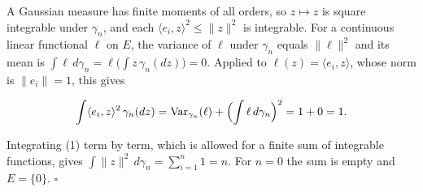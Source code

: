 \documentclass[11pt,a4paper]{article}
\begin{document}
A Gaussian measure has finite moments of all orders, so \(z\mapsto z\) is square integrable under \(\gamma_n\), and each \(\langle e_i,z\rangle^2\le\|z\|^2\) is integrable. For a continuous linear functional \(\ell\) on \(E\), the variance of \(\ell\) under \(\gamma_n\) equals \(\|\ell\|^2\) and its mean is \(\int\ell\,d\gamma_n=\ell\bigl(\int z\,\gamma_n(dz)\bigr)=0\). Applied to \(\ell(z)=\langle e_i,z\rangle\), whose norm is \(\|e_i\|=1\), this gives


\[\int\langle e_i,z\rangle^2\,\gamma_n(dz)=\operatorname{Var}_{\gamma_n}(\ell)+\Bigl(\int\ell\,d\gamma_n\Bigr)^2=1+0=1.\]


Integrating (1) term by term, which is allowed for a finite sum of integrable functions, gives \(\int\|z\|^2\,d\gamma_n=\sum_{i=1}^n1=n\). For \(n=0\) the sum is empty and \(E=\{0\}\). \(\square\)
\end{document}
